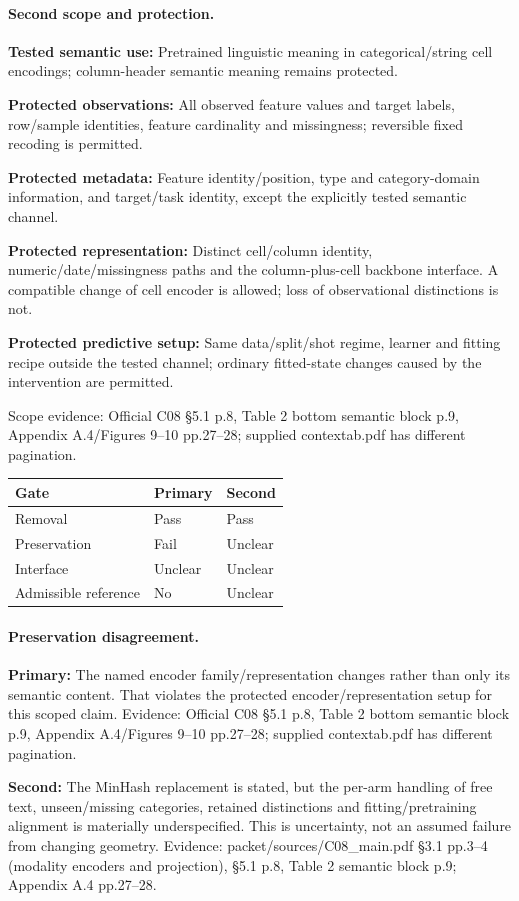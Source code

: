 \documentclass[10pt]{article}
\begin{document}
\paragraph{Second scope and protection.}
\textbf{Tested semantic use:} Pretrained linguistic meaning in categorical/string cell encodings; column-header semantic meaning remains protected.\par
\textbf{Protected observations:} All observed feature values and target labels, row/sample identities, feature cardinality and missingness; reversible fixed recoding is permitted.\par
\textbf{Protected metadata:} Feature identity/position, type and category-domain information, and target/task identity, except the explicitly tested semantic channel.\par
\textbf{Protected representation:} Distinct cell/column identity, numeric/date/missingness paths and the column-plus-cell backbone interface. A compatible change of cell encoder is allowed; loss of observational distinctions is not.\par
\textbf{Protected predictive setup:} Same data/split/shot regime, learner and fitting recipe outside the tested channel; ordinary fitted-state changes caused by the intervention are permitted.\par
Scope evidence: Official C08 §5.1 p.8, Table 2 bottom semantic block p.9, Appendix A.4/Figures 9--10 pp.27--28; supplied contextab.pdf has different pagination.\par
\begin{tabular}{lll}\toprule Gate & Primary & Second \\ \midrule
Removal & Pass & Pass \\
Preservation & Fail & Unclear \\
Interface & Unclear & Unclear \\
Admissible reference & No & Unclear \\
\bottomrule\end{tabular}
\paragraph{Preservation disagreement.}
\textbf{Primary:} The named encoder family/representation changes rather than only its semantic content. That violates the protected encoder/representation setup for this scoped claim. Evidence: Official C08 §5.1 p.8, Table 2 bottom semantic block p.9, Appendix A.4/Figures 9--10 pp.27--28; supplied contextab.pdf has different pagination.\par
\textbf{Second:} The MinHash replacement is stated, but the per-arm handling of free text, unseen/missing categories, retained distinctions and fitting/pretraining alignment is materially underspecified. This is uncertainty, not an assumed failure from changing geometry. Evidence: packet/sources/C08\_main.pdf §3.1 pp.3--4 (modality encoders and projection), §5.1 p.8, Table 2 semantic block p.9; Appendix A.4 pp.27--28.\par
\end{document}
